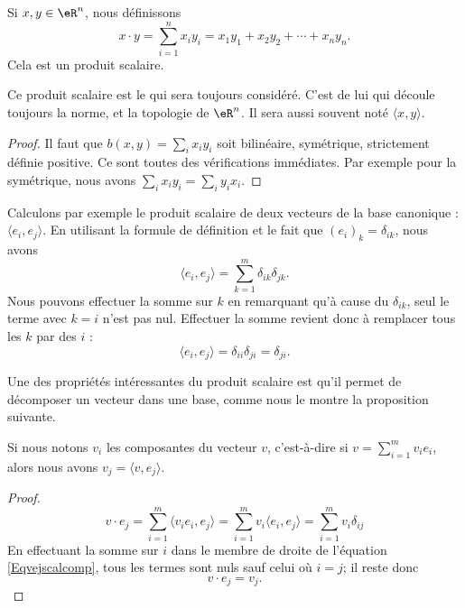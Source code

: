 \begin{propositionDef}     \label{PROPooSKVRooDGVCYj}
	Si \( x,y\in \eR^n\), nous définissons
	\begin{equation}        \label{EQooFITHooEXDCGd}
		x\cdot y=\sum_{i=1}^n x_iy_i =x_1y_1+x_2y_2+\cdots+x_ny_n.
	\end{equation}
	Cela est un produit scalaire.

	Ce produit scalaire est le  qui sera toujours considéré. C'est de lui qui découle toujours la norme, et la topologie de \( \eR^n\). Il sera aussi souvent noté \( \langle x, y\rangle \).
\end{propositionDef}

\begin{proof}
	Il faut que \( b(x,y)=\sum_ix_iy_i\) soit bilinéaire, symétrique, strictement définie positive. Ce sont toutes des vérifications immédiates. Par exemple pour la symétrique, nous avons \( \sum_{i}x_iy_i=\sum_iy_ix_i\).
\end{proof}


Calculons par exemple le produit scalaire de deux vecteurs de la base canonique : \( \langle e_i, e_j\rangle\). En utilisant la formule de définition et le fait que \( (e_i)_k=\delta_{ik}\), nous avons
\begin{equation}
	\langle e_i, e_j\rangle =\sum_{k=1}^m\delta_{ik}\delta_{jk}.
\end{equation}
Nous pouvons effectuer la somme sur \( k\) en remarquant qu'à cause du \( \delta_{ik}\), seul le terme avec \( k=i\) n'est pas nul. Effectuer la somme revient donc à remplacer tous les \( k\) par des \( i\) :
\begin{equation}
	\langle e_i, e_j\rangle =\delta_{ii}\delta_{ji}=\delta_{ji}.
\end{equation}

Une des propriétés intéressantes du produit scalaire est qu'il permet de décomposer un vecteur dans une base, comme nous le montre la proposition suivante.

\begin{proposition}     \label{PropScalCompDec}
	Si nous notons \( v_i\) les composantes du vecteur \( v\), c'est-à-dire si \( v=\sum_{i=1}^m v_ie_i\), alors nous avons \( v_j=\langle v, e_j\rangle\).
\end{proposition}

\begin{proof}
	\begin{equation}    \label{Eqvejscalcomp}
		v\cdot e_j=\sum_{i=1}^m\langle v_ie_i, e_j\rangle =\sum_{i=1}^mv_i\langle e_i, e_j\rangle =\sum_{i=1}^mv_i\delta_{ij}
	\end{equation}
	En effectuant la somme sur \( i\) dans le membre de droite de l'équation \eqref{Eqvejscalcomp}, tous les termes sont nuls sauf celui où \( i=j\); il reste donc
	\begin{equation}
		v\cdot e_j=v_j.
	\end{equation}
\end{proof}

